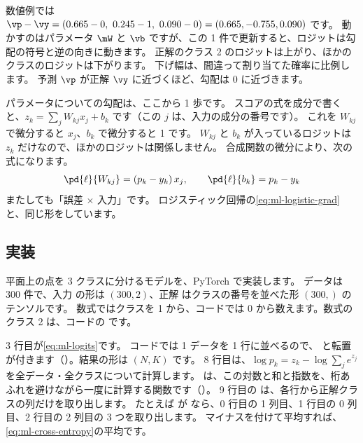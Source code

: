 数値例では $\vp-\vy = (0.665-0,\ 0.245-1,\ 0.090-0) = (0.665, -0.755, 0.090)$ です。
動かすのはパラメータ $\mW$ と $\vb$ ですが、この 1 件で更新すると、ロジットは勾配の符号と逆の向きに動きます。
正解のクラス 2 のロジットは上がり、ほかのクラスのロジットは下がります。
下げ幅は、間違って割り当てた確率に比例します。
予測 $\vp$ が正解 $\vy$ に近づくほど、勾配は 0 に近づきます。

パラメータについての勾配は、ここから 1 歩です。
スコアの式を成分で書くと、$z_k = \sum_j W_{kj}x_j + b_k$ です（この $j$ は、入力の成分の番号です）。
これを $W_{kj}$ で微分すると $x_j$、$b_k$ で微分すると 1 です。
$W_{kj}$ と $b_k$ が入っているロジットは $z_k$ だけなので、ほかのロジットは関係しません。
合成関数の微分により、次の式になります。
\begin{equation}
\pd{\ell}{W_{kj}} = (p_k - y_k)\,x_j,\qquad \pd{\ell}{b_k} = p_k - y_k
\label{eq:ml-softmax-param-grad}
\end{equation}
またしても「誤差 $\times$ 入力」です。
ロジスティック回帰の\eqref{eq:ml-logistic-grad}と、同じ形をしています。

\subsection*{実装}

平面上の点を 3 クラスに分けるモデルを、PyTorch で実装します。
データは 300 件で、入力  の形は $(300, 2)$、正解  はクラスの番号を並べた形 $(300,)$ のテンソルです。
数式ではクラスを 1 から、コードでは 0 から数えます。数式のクラス 2 は、コードの  です。


3 行目が\eqref{eq:ml-logits}です。
コードでは 1 データを 1 行に並べるので、 と転置が付きます（）。結果の形は $(N, K)$ です。
8 行目は、$\log p_k = z_k - \log\sum_j e^{z_j}$ を全データ・全クラスについて計算します。
 は、この対数と和と指数を、桁あふれを避けながら一度に計算する関数です（）。
9 行目の  は、各行から正解クラスの列だけを取り出します。
たとえば  が \code{[1, 0, 2]} なら、0 行目の 1 列目、1 行目の 0 列目、2 行目の 2 列目の 3 つを取り出します。
マイナスを付けて平均すれば、\eqref{eq:ml-cross-entropy}の平均です。

